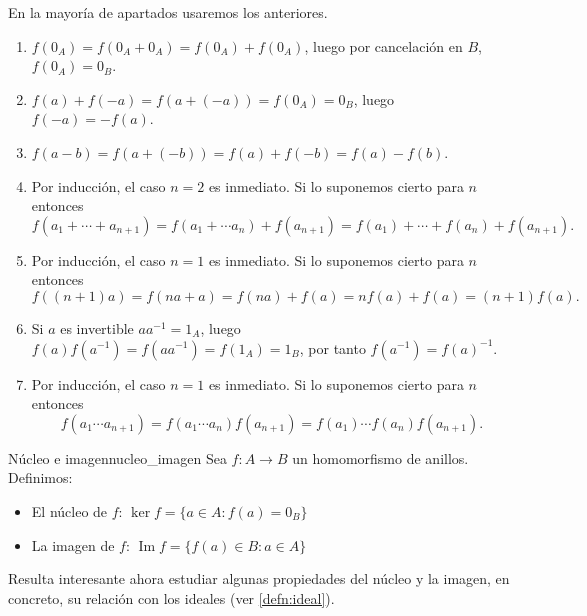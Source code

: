 \begin{proofbox}
    En la mayoría de apartados usaremos los anteriores.
    \begin{enumerate}
        \item \(f(0_A) = f(0_A + 0_A) = f(0_A) + f(0_A)\), luego por cancelación en \(B\), \(f(0_A) = 0_B\).
        
        \item \(f(a) + f(-a) = f(a + (-a)) = f(0_A) = 0_B\), luego \(f(-a) = -f(a)\).

        \item \(f(a - b) = f(a + (-b)) = f(a) + f(-b) = f(a) - f(b)\).

        \item Por inducción, el caso $n = 2$ es inmediato. Si lo suponemos cierto para $n$ entonces
        \[
        f(a_1 + \cdots + a_{n+1}) = f(a_1 + \cdots a_n) + f(a_{n+1}) = f(a_1) + \cdots + f(a_n) + f(a_{n+1}).
        \]
        
        \item Por inducción, el caso $n = 1$ es inmediato. Si lo suponemos cierto para $n$ entonces
        \[
        f((n+1) a) = f(na + a) = f(na) + f(a) = nf(a) + f(a) = (n+1) f(a).
        \]

        \item Si \(a\) es invertible \(aa^{-1} = 1_A\), luego \(f(a)f(a^{-1}) = f(aa^{-1}) = f(1_A) = 1_B\), por tanto \(f(a^{-1}) = f(a)^{-1}\).

        \item Por inducción, el caso $n = 1$ es inmediato. Si lo suponemos cierto para $n$ entonces
        \[
        f(a_1 \cdots a_{n+1}) = f(a_1 \cdots a_n)f(a_{n+1}) = f(a_1) \cdots f(a_n) f(a_{n+1}).
        \]
    \end{enumerate}
\end{proofbox}

\begin{definition}{Núcleo e imagen}{nucleo_imagen}
    Sea \(f: A \to B\) un homomorfismo de anillos. Definimos:
    \begin{itemize}
        \item El {núcleo} de \(f\): \(\ker f = \{a \in A : f(a) = 0_B\}\)
        \item La {imagen} de \(f\): \(\operatorname{Im} f = \{f(a) \in B : a \in A\}\)
    \end{itemize}
\end{definition}

Resulta interesante ahora estudiar algunas propiedades del núcleo y la imagen, en concreto, su relación con los ideales (ver \ref{defn:ideal}).

